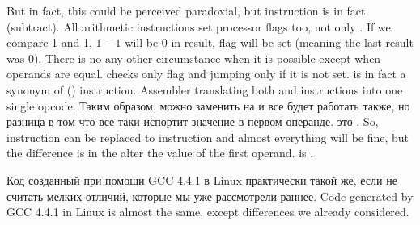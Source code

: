 \label{CMPandSUB}
{But in fact, this could be perceived paradoxial, but \CMP instruction is in fact \SUB (subtract).}
{All arithmetic instructions set processor flags too, not only \CMP.}
{If we compare 1 and 1, $1-1$ will be $0$ in result, \ZF flag will be set (meaning the last result was $0$).}
{There is no any other circumstance when it is possible except when operands are equal.}
{\JNE checks only \ZF flag and jumping only if it is not set. 
\JNE is in fact a synonym of \JNZ () instruction.}
{Assembler translating both \JNE and \JNZ instructions into one single opcode.}
\IFRU
{Таким образом, можно \CMP заменить на \SUB и все будет работать также, но разница в том что \SUB 
все-таки испортит значение в первом операнде. \CMP это .}
{So, \CMP instruction can be replaced to \SUB instruction and almost everything will be fine,
but the difference is in 
the \SUB alter the value of the first operand.
\CMP is .}

\IFRU
{Код созданный при помощи GCC 4.4.1 в Linux практически такой же, если не считать мелких отличий, 
которые мы уже рассмотрели раннее.}
{Code generated by GCC 4.4.1 in Linux is almost the same, except differences we already considered.}


